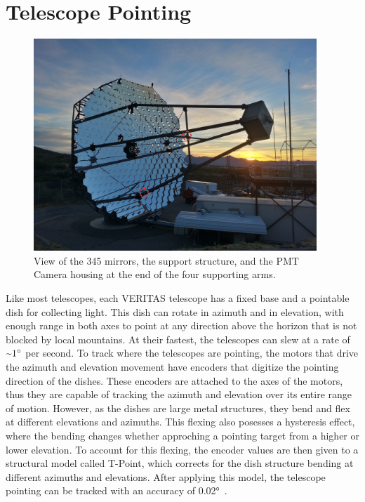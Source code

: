 \section{Telescope Pointing}\label{sec:telpoint}

\begin{figure}[ht]
  \centering
  \includegraphics[width=0.95\textwidth]{images/single_telescope}
  \caption[Single Veritas Telescope]{
    View of the 345 mirrors, the support structure, and the PMT Camera housing at the end of the four supporting arms.}
  \label{fig:davcottel}
\end{figure}

Like most telescopes, each VERITAS telescope has a fixed base and a pointable dish for collecting light.
This dish can rotate in azimuth and in elevation, with enough range in both axes to point at any direction above the horizon that is not blocked by local mountains.
At their fastest, the telescopes can slew at a rate of $ \nicetilde \ang{1} $ per second.
To track where the telescopes are pointing, the motors that drive the azimuth and elevation movement have encoders that digitize the pointing direction of the dishes.
These encoders are attached to the axes of the motors, thus they are capable of tracking the azimuth and elevation over its entire range of motion.
However, as the dishes are large metal structures, they bend and flex at different elevations and azimuths.
This flexing also posesses a hysteresis effect, where the bending changes whether approching a pointing target from a higher or lower elevation.
To account for this flexing, the encoder values are then given to a structural model called T-Point, which corrects for the dish structure bending at different azimuths and elevations.
After applying this model, the telescope pointing can be tracked with an accuracy of \nicetilde{}\ang{0.02}~\cite{holder2008status}.

